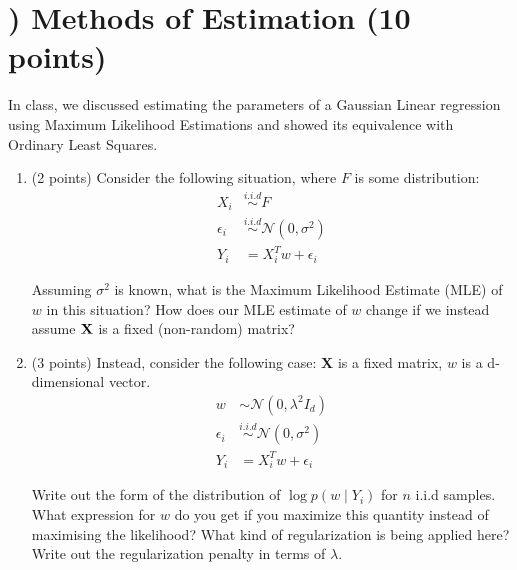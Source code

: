 \documentclass[11pt]{article}
\newcounter{QuestionCounter}
\begin{document}
\section*{) Methods of Estimation (10 points)}

 In class, we discussed estimating the parameters of a Gaussian Linear regression using Maximum Likelihood Estimations and showed its equivalence with Ordinary Least Squares.
 

\begin{enumerate}[{(1)}]

\item (2 points) Consider the following situation, where $F$ is some distribution:
 \begin{align*}
     X_i &\stackrel{i.i.d}{\sim} F\\
     \epsilon_i &\stackrel{i.i.d}{\sim} \mathcal{N}(0, \sigma^2)\\
     Y_i &= X_i^Tw + \epsilon_i
 \end{align*}
 
 Assuming $\sigma^2$ is known, what is the Maximum Likelihood Estimate (MLE) of $w$ in this situation? How does our MLE estimate of $w$ change if we instead assume ${\bf X}$ is a fixed (non-random) matrix?

\begin{answertext}{9cm}{}


  
\end{answertext} 

\item (3 points) Instead, consider the following case: \textbf{X} is a fixed matrix, $w$ is a d-dimensional vector.
\begin{align*}
    w &\sim \mathcal{N}(0, \lambda^2I_d)\\
    \epsilon_i &\stackrel{i.i.d}{\sim} \mathcal{N}(0, \sigma^2)\\
    Y_i &= X_i^Tw + \epsilon_i
\end{align*}

Write out the form of the distribution of $\log p(w \mid Y_i)$ for $n$ i.i.d samples. What expression for $w$ do you get if you maximize this quantity instead of maximising the likelihood? What kind of regularization is being applied here? Write out the regularization penalty in terms of $\lambda$.


\begin{answertext}{10cm}{}
    
  
  

\end{answertext}
\end{enumerate}
\end{document}
